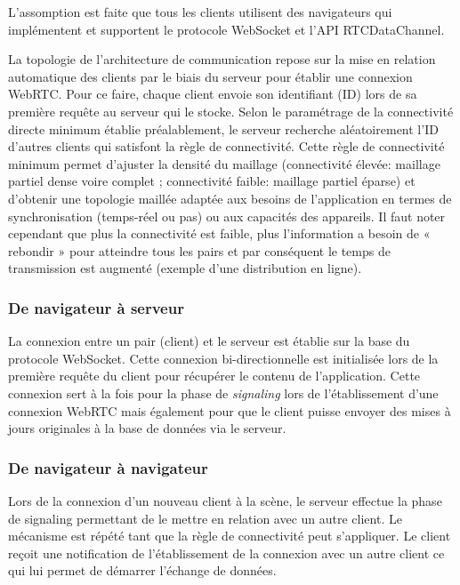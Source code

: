 L'assomption est faite que tous les clients utilisent des navigateurs qui 
implémentent et supportent le protocole WebSocket et l'\gls{API} 
RTCDataChannel. 

La topologie de l'architecture de communication repose sur la mise en relation 
automatique des clients par le biais du serveur pour établir une connexion 
\gls{WebRTC}. Pour ce faire, chaque client envoie son identifiant (ID) lors de sa 
première requête au serveur qui le stocke. Selon le paramétrage de la connectivité 
directe minimum établie préalablement, le serveur recherche aléatoirement l'ID 
d'autres clients qui satisfont la règle de connectivité. Cette règle de connectivité 
minimum permet d'ajuster la densité du maillage (connectivité élevée: maillage 
partiel dense voire complet ; connectivité faible: maillage partiel éparse) et 
d'obtenir une topologie maillée adaptée aux besoins de l'application en termes de 
synchronisation (temps-réel ou pas) ou aux capacités des appareils. Il faut noter 
cependant que plus la connectivité est faible, plus l'information a besoin de « 
rebondir » pour atteindre tous les pairs et par conséquent le temps de 
transmission est augmenté (exemple d'une distribution en ligne). 

\subsubsection{De navigateur à serveur}
La connexion entre un pair (client) et le serveur est établie sur la base du protocole 
\gls{WebSocket}. Cette connexion bi-directionnelle est initialisée lors de la 
première requête du client pour récupérer le contenu de l'application. Cette 
connexion sert à la fois pour la phase de \textit{signaling} lors de l'établissement 
d'une connexion WebRTC mais également pour que le client puisse envoyer des 
mises à jours originales à la base de données via le serveur.

\subsubsection{De navigateur à navigateur}
Lors de la connexion d'un nouveau client à la scène, le serveur effectue la phase 
de signaling permettant de le mettre en relation avec un autre client. Le 
mécanisme est répété tant que la règle de connectivité peut s'appliquer. Le client 
reçoit une notification de l'établissement de la connexion avec un autre client ce 
qui lui permet de démarrer l'échange de données.

